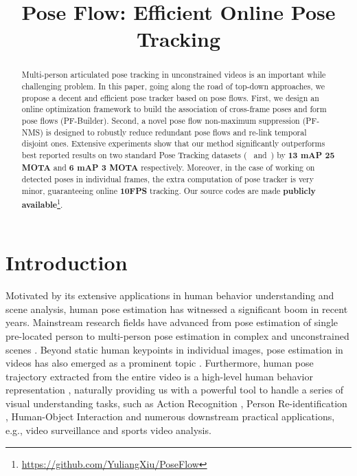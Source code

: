 \documentclass{bmvc2k}
\title{Pose Flow: Efficient Online Pose Tracking}
\begin{document}
\maketitle

\begin{abstract}
Multi-person articulated pose tracking in unconstrained videos is an important while challenging problem. In this paper, going along the road of top-down approaches, we propose a decent and efficient pose tracker based on pose flows. First, we design an online optimization framework to build the association of cross-frame poses and form pose flows (PF-Builder). Second, a novel pose flow non-maximum suppression (PF-NMS) is designed to robustly reduce redundant pose flows and re-link temporal disjoint ones. Extensive experiments show that our method significantly outperforms best reported results on two standard Pose Tracking datasets (~\cite{iqbal2017posetrack} and~\cite{girdhar2017detect}) by \textbf{13 mAP 25 MOTA} and \textbf{6 mAP 3 MOTA} respectively. Moreover, in the case of working on detected poses in individual frames, the extra computation of  pose tracker is very minor, guaranteeing online \textbf{10FPS} tracking. Our source codes are made \textbf{publicly available}\footnote{\href{url}{https://github.com/YuliangXiu/PoseFlow}}.
\end{abstract}

\section{Introduction}
\label{sec:intro}

Motivated by its extensive applications in human behavior understanding and scene analysis, human pose estimation has witnessed a significant boom in recent years. Mainstream research fields have advanced from pose estimation of single pre-located person \cite{newell2016stacked,chu2017multi} to multi-person pose estimation in complex and unconstrained scenes \cite{cao2017realtime,fang2017rmpe}. Beyond static human keypoints in individual images, pose estimation in videos has also emerged as a prominent topic  \cite{song2017thin,zhang2015human}. Furthermore, human pose trajectory extracted from the entire video is a high-level human behavior representation \cite{wang2013action,wang2015action}, naturally providing us with a powerful tool to handle a series of visual understanding tasks, such as Action Recognition  \cite{cheron2015p}, Person Re-identification \cite{su2017pose,zheng2017pose}, Human-Object Interaction  \cite{gkioxari2017detecting} and numerous downstream practical applications, e.g., video surveillance and sports video analysis.
\end{document}
